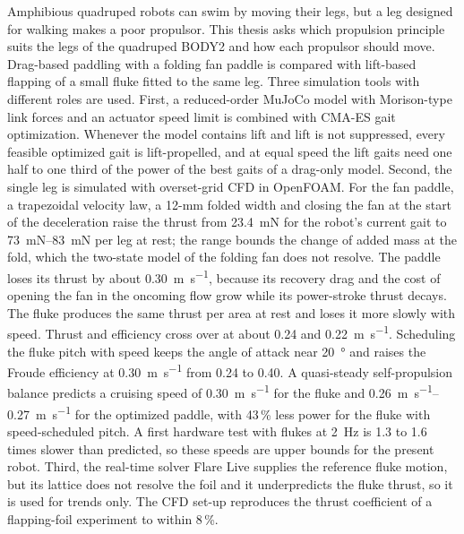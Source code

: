 \thispagestyle{empty}
\vspace*{25mm}
\vspace{6mm}
\noindent
Amphibious quadruped robots can swim by moving their legs, but a leg designed for walking makes a poor
propulsor. This thesis asks which propulsion principle suits the legs of the quadruped BODY2 and how each
propulsor should move. Drag-based paddling with a folding fan paddle is compared with lift-based flapping of a
small fluke fitted to the same leg. Three simulation tools with different roles are used. First, a reduced-order
MuJoCo model with Morison-type link forces and an actuator speed limit is combined with CMA-ES gait
optimization. Whenever the model contains lift and lift is not suppressed, every feasible optimized gait is lift-propelled, and at equal speed the lift gaits
need one half to one third of the power of the best gaits of a drag-only model. Second, the single leg is simulated
with overset-grid CFD in OpenFOAM. For the fan paddle, a trapezoidal velocity law, a 12-mm folded width and
closing the fan at the start of the deceleration raise the thrust from \SI{23.4}{\milli\newton} for the robot's
current gait to \SIrange{73}{83}{\milli\newton} per leg at rest; the range bounds the change of added mass at the
fold, which the two-state model of the folding fan does not resolve. The paddle loses its thrust by about
\SI{0.30}{\metre\per\second}, because its recovery drag and the cost of opening the fan in the oncoming flow grow
while its power-stroke thrust decays. The fluke produces the same thrust per area at rest and loses it more slowly with speed.
Thrust and efficiency cross over at about \SI{0.24}{} and \SI{0.22}{\metre\per\second}. Scheduling the fluke pitch with speed keeps the angle of attack near
\SI{20}{\degree} and raises the Froude efficiency at \SI{0.30}{\metre\per\second} from 0.24 to 0.40. A
quasi-steady self-propulsion balance predicts a cruising speed of \SI{0.30}{\metre\per\second} for the fluke and
\SIrange{0.26}{0.27}{\metre\per\second} for the optimized paddle, with 43\,\% less power for the fluke with
speed-scheduled pitch. A first hardware test with flukes at \SI{2}{\hertz} is 1.3 to 1.6 times slower than predicted, so these
speeds are upper bounds for the present robot. Third, the real-time solver Flare Live supplies the reference fluke motion, but its lattice does not resolve the
foil and it underpredicts the fluke thrust, so it is used for trends only. The CFD set-up
reproduces the thrust coefficient of a flapping-foil experiment to within 8\,\%.

